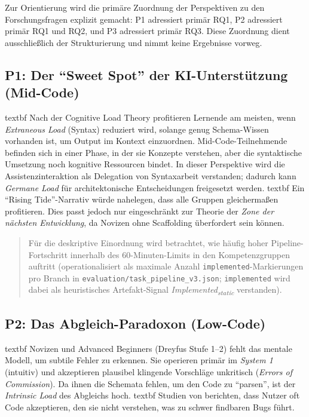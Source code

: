 Zur Orientierung wird die primäre Zuordnung der Perspektiven zu den Forschungsfragen explizit gemacht: P1 adressiert primär RQ1, P2 adressiert primär RQ1 und RQ2, und P3 adressiert primär RQ3. Diese Zuordnung dient ausschlie\ss{}lich der Strukturierung und nimmt keine Ergebnisse vorweg.

\subsection{P1: Der \enquote{Sweet Spot} der KI-Unterstützung (Mid-Code)}
\noindent\csname textbf Nach der Cognitive Load Theory profitieren Lernende am meisten, wenn \emph{Extraneous Load} (Syntax) reduziert wird, solange genug Schema-Wissen vorhanden ist, um Output im Kontext einzuordnen. Mid-Code-Teilnehmende befinden sich in einer Phase, in der sie Konzepte verstehen, aber die syntaktische Umsetzung noch kognitive Ressourcen bindet. In dieser Perspektive wird die Assistenzinteraktion als Delegation von Syntaxarbeit verstanden; dadurch kann \emph{Germane Load} für architektonische Entscheidungen freigesetzt werden.
\noindent\csname textbf Ein \enquote{Rising Tide}-Narrativ würde nahelegen, dass alle Gruppen gleichermaßen profitieren. Dies passt jedoch nur eingeschränkt zur Theorie der \emph{Zone der nächsten Entwicklung}, da Novizen ohne Scaffolding überfordert sein können.

\begin{quote}
Für die deskriptive Einordnung wird betrachtet, wie häufig hoher Pipeline-Fortschritt innerhalb des 60-Minuten-Limits in den Kompetenzgruppen auftritt (operationalisiert als maximale Anzahl \texttt{implemented}-Markierungen pro Branch in \nolinkurl{evaluation/task_pipeline_v3.json}; \texttt{implemented} wird dabei als heuristisches Artefakt-Signal \textit{Implemented\textsubscript{static}} verstanden).
\end{quote}

\subsection{P2: Das Abgleich-Paradoxon (Low-Code)}
\noindent\csname textbf Novizen und Advanced Beginners (Dreyfus Stufe 1--2) fehlt das mentale Modell, um subtile Fehler zu erkennen. Sie operieren primär im \emph{System 1} (intuitiv) und akzeptieren plausibel klingende Vorschläge unkritisch (\emph{Errors of Commission}). Da ihnen die Schemata fehlen, um den Code zu \enquote{parsen}, ist der \emph{Intrinsic Load} des Abgleichs hoch.
\noindent\csname textbf Studien von \textcite{vaithilingam2022codecompletion} berichten, dass Nutzer oft Code akzeptieren, den sie nicht verstehen, was zu schwer findbaren Bugs führt.


